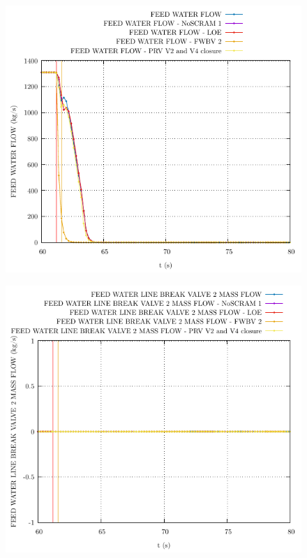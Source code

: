 \documentclass{article}
\begin{document}
\begin{multicols}{2}
\begin{figure}[H]
\centering
\includegraphics[width=\linewidth]{./graphs/FEED WATER FLOW.pdf}
\end{figure}
\begin{figure}[H]
\centering
\includegraphics[width=\linewidth]{./graphs/FEED WATER LINE BREAK VALVE 2 MASS FLOW.pdf}
\end{figure}

\end{multicols}
\end{document}
